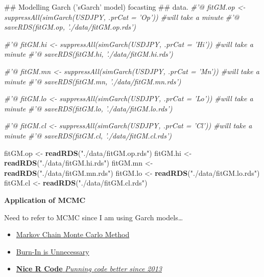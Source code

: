 \documentclass[]{tufte-book}
\newenvironment{Shaded}{}{}
\newcommand{\KeywordTok}[1]{\textcolor[rgb]{0.00,0.44,0.13}{\textbf{#1}}}
\newcommand{\StringTok}[1]{\textcolor[rgb]{0.25,0.44,0.63}{#1}}
\newcommand{\CommentTok}[1]{\textcolor[rgb]{0.38,0.63,0.69}{\textit{#1}}}
\newcommand{\NormalTok}[1]{#1}
\providecommand{\tightlist}{%
  \setlength{\itemsep}{0pt}\setlength{\parskip}{0pt}}
\begin{document}
\begin{Shaded}
\begin{Highlighting}[]
\NormalTok{## Modelling Garch ('sGarch' model) focasting}
\NormalTok{## data.}
\CommentTok{#'@ fitGM.op <- suppressAll(simGarch(USDJPY, .prCat = 'Op')) #will take a minute}
\CommentTok{#'@ saveRDS(fitGM.op, './data/fitGM.op.rds')}

\CommentTok{#'@ fitGM.hi <- suppressAll(simGarch(USDJPY, .prCat = 'Hi')) #will take a minute}
\CommentTok{#'@ saveRDS(fitGM.hi, './data/fitGM.hi.rds')}

\CommentTok{#'@ fitGM.mn <- suppressAll(simGarch(USDJPY, .prCat = 'Mn')) #will take a minute}
\CommentTok{#'@ saveRDS(fitGM.mn, './data/fitGM.mn.rds')}

\CommentTok{#'@ fitGM.lo <- suppressAll(simGarch(USDJPY, .prCat = 'Lo')) #will take a minute}
\CommentTok{#'@ saveRDS(fitGM.lo, './data/fitGM.lo.rds')}

\CommentTok{#'@ fitGM.cl <- suppressAll(simGarch(USDJPY, .prCat = 'Cl')) #will take a minute}
\CommentTok{#'@ saveRDS(fitGM.cl, './data/fitGM.cl.rds')}

\NormalTok{fitGM.op <-}\StringTok{ }\KeywordTok{readRDS}\NormalTok{(}\StringTok{"./data/fitGM.op.rds"}\NormalTok{)}
\NormalTok{fitGM.hi <-}\StringTok{ }\KeywordTok{readRDS}\NormalTok{(}\StringTok{"./data/fitGM.hi.rds"}\NormalTok{)}
\NormalTok{fitGM.mn <-}\StringTok{ }\KeywordTok{readRDS}\NormalTok{(}\StringTok{"./data/fitGM.mn.rds"}\NormalTok{)}
\NormalTok{fitGM.lo <-}\StringTok{ }\KeywordTok{readRDS}\NormalTok{(}\StringTok{"./data/fitGM.lo.rds"}\NormalTok{)}
\NormalTok{fitGM.cl <-}\StringTok{ }\KeywordTok{readRDS}\NormalTok{(}\StringTok{"./data/fitGM.cl.rds"}\NormalTok{)}
\end{Highlighting}
\end{Shaded}

\textbf{Application of MCMC}

Need to refer to MCMC since I am using Garch models\ldots{}

\begin{itemize}
\tightlist
\item
  \href{https://support.sas.com/documentation/cdl/en/statug/63033/HTML/default/viewer.htm\#statug_introbayes_sect007.htm}{{Markov
  Chain Monte Carlo Method}}
\item
  \href{http://users.stat.umn.edu/~geyer/mcmc/burn.html}{{Burn-In is
  Unnecessary}}
\item
  \href{https://nicercode.github.io/guides/mcmc/}{{\textbf{Nice R Code}
  \emph{Punning code better since 2013}}}
\end{itemize}
\end{document}
